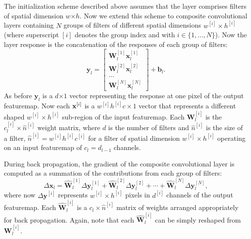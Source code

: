 \documentclass[thesis]{subfiles}
\begin{document}
    The initialization scheme described above assumes that the layer comprises filters of spatial dimension $w$$\times$$h$. Now we extend this scheme to composite convolutional layers containing $N$ groups of filters of different spatial dimensions $w^{[i]} \times h^{[i]}$ (where superscript $[i]$ denotes the group index and with $i\in \{1,\dots,N\}$). Now the layer response is the concatenation of the responses of each group of filters:
    \begin{equation}
    \mathbf{y}_l =\begin{bmatrix}\mathbf{W}_l^{[1]} \mathbf{x}_l^{[1]} \\ \mathbf{W}_l^{[2]} \mathbf{x}_l^{[2]} \\ \dots \\ \mathbf{W}_l^{[N]} \mathbf{x}_l^{[N]} \end{bmatrix} + \mathbf{b}_l.
    \end{equation}
    As before $\mathbf{y}_l$ is a $d$$\times$$1$ vector representing the response at one pixel of the output \gls{featuremap}. Now each ${\bf x}^{[i]}$ is a $w^{[i]} h^{[i]} c \times 1$ vector that represents a different shaped $w^{[i]} \times h^{[i]}$ sub-region of the input \gls{featuremap}. Each $\mathbf{W}_l^{[i]}$ is the $c_l^{[i]}\times \hat{n}^{[i]}$ weight matrix, where $d$ is the number of filters and $\hat{n}^{[i]}$ is the size of a filter, \ie $\hat{n}^{[i]} = w^{[i]} h^{[i]} c^{[i]}$ for a filter of spatial dimension $w^{[i]} \times h^{[i]}$ operating on an input \gls{featuremap} of $c_l = d_{l-1}$ channels.
    
    During back propagation, the gradient of the composite convolutional layer is computed as a summation of the contributions from each group of filters:
    \begin{equation}
    \Delta \mathbf{x}_l = \hat{\mathbf{W}}_l^{[1]} \Delta \mathbf{y}_l^{[1]} +  \hat{\mathbf{W}}_l^{[2]} \Delta \mathbf{y}_l^{[2]} + \cdots+  \hat{\mathbf{W}}_l^{[N]} \Delta \mathbf{y}_l^{[N]},
    \label{eq:back_prop_gradient_composite}
    \end{equation}
    where now $\Delta \mathbf{y}^{[i]}$ represents $w^{[i]} \times h^{[i]}$ pixels in $d^{[i]}$ channels of the output \gls{featuremap}. Each $\hat{\mathbf{W}}_l^{[i]}$ is a $c_l \times \hat{n}^{[i]}$ matrix of weights arranged appropriately for back propagation. Again, note that each $\hat{\mathbf{W}}_l^{[i]}$ can be simply reshaped from $\mathbf{W}_l^{[i]}$.
    
\end{document}
